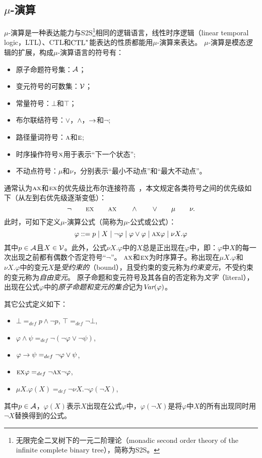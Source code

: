 \subsection{$\mu$-演算}
$\mu$-演算是一种表达能力与S2S\footnote{无限完全二叉树下的一元二阶理论（monadic second order theory of the infinite complete binary tree），简称为S2S。}相同的逻辑语言，线性时序逻辑（linear temporal  logic，LTL）、CTL和$\textrm{CTL}^*$能表达的性质都能用$\mu$-演算来表达。
$\mu$-演算是模态逻辑的扩展，构成$\mu$-演算语言的符号有：
\begin{itemize}
	\item 原子命题符号集：$\cal A$；
	\item 变元符号的可数集：$\cal V$；
	\item 常量符号：$\bot$和$\top$；
	\item 布尔联结符号：$\vee$，$\wedge$，$\rightarrow$和$\neg$;
	\item 路径量词符号：$\textsc{a}$和$\textsc{e}$;
	\item 时序操作符号$\textsc{x}$用于表示“下一个状态”;
	\item 不动点符号：$\mu$和$\nu$，分别表示“最小不动点”和“最大不动点”。
\end{itemize}

通常认为$\textsc{a}\textsc{x}$和$\textsc{e}\textsc{x}$的优先级比布尔连接符高~\cite{bradfield2018mu}，本文规定各类符号之间的优先级如下（从左到右优先级逐渐变低）：
\[
\neg\qquad \textsc{e}\textsc{x}\qquad \textsc{a}\textsc{x}\qquad \wedge\qquad \vee\qquad \mu \qquad \nu.
\]
此时，可如下定义$\mu$-演算公式（简称为$\mu$-公式或公式）：
\[
	\varphi ::=   p\mid  X\mid \neg \varphi\mid \varphi \vee \varphi \mid \textsc{a}\textsc{x} \varphi\mid  \nu X. \varphi
\]
其中$p\in {\cal A}$且$X\in {\cal V}$。此外，公式$\nu X.\varphi$中的$X$总是正出现在$\varphi$中，即：$\varphi$中$X$的每一次出现之前都有偶数个否定符号“$\neg$”。
$\textsc{a}\textsc{x}$和$\textsc{e}\textsc{x}$为时序算子。称出现在$\mu X. \varphi$和$\nu X. \varphi$中的变元$X$是\emph{受约束的}（bound），且受约束的变元称为{\em 约束变元}，不受约束的变元称为\emph{自由变元}。
原子命题和变元符号及其各自的否定称为\emph{文字}（literal），出现在公式$\varphi$中的{\em 原子命题和变元的集合}记为$\textit{Var}(\varphi)$。

其它公式定义如下：
\begin{itemize}
	\item $\bot=_{def} p\land\neg p$, $\top=_{def}\neg\bot$,
	\item $\varphi\land\psi =_{def} \neg(\neg\varphi\lor \neg\psi)$,
	\item $\varphi\rightarrow\psi=_{def} \neg\varphi \lor \psi$,
	\item $\textsc{e}\textsc{x}\varphi =_{def} \neg\textsc{a}\textsc{x}\neg\varphi$,
	\item $\mu X.\varphi(X)=_{def}  \neg \nu X.\neg\varphi(\neg X)$,
\end{itemize}
其中$p\in {\cal A}$，$\varphi(X)$表示$X$出现在公式$\varphi$中，$\varphi(\neg X)$是将$\varphi$中$X$的所有出现同时用$\neg X$替换得到的公式。

